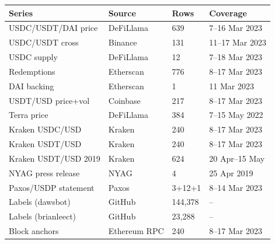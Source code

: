 \begin{tabular}{@{}p{2.9cm}p{2.9cm}p{1.5cm}p{2.7cm}@{}}
\toprule
Series & Source & Rows & Coverage \\
\midrule
USDC/USDT/DAI price & DeFiLlama & 639 & 7--16 Mar 2023 \\
USDC/USDT cross & Binance & 131 & 11--17 Mar 2023 \\
USDC supply & DeFiLlama & 12 & 7--18 Mar 2023 \\
Redemptions & Etherscan & 776 & 8--17 Mar 2023 \\
DAI backing & Etherscan & 1 & 11 Mar 2023 \\
USDT/USD price+vol & Coinbase & 217 & 8--17 Mar 2023 \\
Terra price & DeFiLlama & 384 & 7--15 May 2022 \\
\midrule
Kraken USDC/USD & Kraken & 240 & 8--17 Mar 2023 \\
Kraken USDT/USD & Kraken & 240 & 8--17 Mar 2023 \\
Kraken USDT/USD 2019 & Kraken & 624 & 20 Apr--15 May \\
NYAG press release & NYAG & 4 & 25 Apr 2019 \\
Paxos/USDP statement & Paxos & 3+12+1 & 8--14 Mar 2023 \\
Labels (dawsbot) & GitHub & 144{,}378 & -- \\
Labels (brianleect) & GitHub & 23{,}288 & -- \\
Block anchors & Ethereum RPC & 240 & 8--17 Mar 2023 \\
\bottomrule
\end{tabular}

